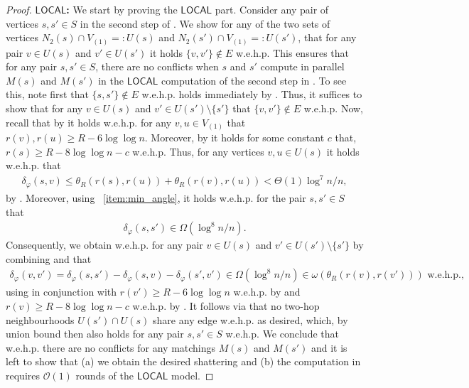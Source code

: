 \documentclass[letterpaper,11pt]{article}
\newcommand{\wehp}{w.e.h.p.\xspace}
\newcommand{\1}{\mathbb I}
\newcommand{\bigO}{\mathcal{O}}
\newcommand{\LOCAL}{\ensuremath{\mathsf{LOCAL}}\xspace}
\newcommand{\angulardist}[2]{\delta_\varphi(#1,#2)}
\begin{document}
\begin{proof}
\textbf{\LOCAL:}  We start by proving the \LOCAL part. Consider any pair of vertices $s, s' \in S$ in the second step of \algos. We show for any of the two sets of vertices $N_2(s) \cap V_{(1)} =: U(s) $ and  $N_2(s') \cap V_{(1)} =: U(s')$, that for any pair $v \in U(s)$ and $v' \in U(s')$ it holds $\{v,v'\} \not \in E$ \wehp This ensures that for any pair $s, s' \in S$,  there are no conflicts when $s$ and $s'$ compute in parallel $M(s)$ and $M(s')$ in the \LOCAL computation of the second step in \algos. To see this, note first that $\{s,s'\} \not\in E$ \wehp holds immediately by . Thus, it suffices to show that for any $v \in U(s)$ and $v' \in U(s')\setminus\{s'\}$ that $\{v,v'\} \not \in E$ \wehp Now, recall that by  it holds \wehp for any $v,u \in V_{(1)}$ that $r(v),r(u) \geq R - 6\log\log n$. Moreover, by  it holds for some constant $c$ that, $r(s) \geq R - 8\log\log n -c$ \wehp Thus, for any vertices $v, u \in U(s)$ it holds \wehp that 
  \begin{align}\label{eq:two-hop-angle}
      \angulardist{s}{v} \leq \theta_R(r(s), r(u)) + \theta_R(r(v), r(u)) < \Theta(1) \log^{7} n / n, 
  \end{align} 
by . Moreover, using ~\cref{item:min_angle}, it holds \wehp for the pair $s, s' \in S$ that
%
\begin{align}\label{eq:separator-angle}
     \angulardist{s}{s'}  \in  \Omega(\log^8 n / n).
\end{align}
%
Consequently, we obtain \wehp for any pair $v \in U(s)$ and $v' \in U(s')\setminus\{s'\}$ by combining  and  that
%
\begin{align}\label{eq:two-hop-intersection}
    \angulardist{v}{v'} = \angulardist{s}{s'} - \angulardist{s}{v} - \angulardist{s'}{v'} \in \Omega(\log^8 n / n) \in \omega(\theta_R(r(v), r(v'))) \text{ \wehp,}
\end{align}
%
using  in conjunction with $r(v') \geq R - 6\log\log n$ \wehp by  and $r(v) \geq R - 8\log\log n -c$ \wehp by . It follows via  that no two-hop neighbourhoods $U(s') \cap U(s)$ share any edge \wehp as desired, which, by union bound then also holds for any pair $s, s' \in S$ \wehp We conclude that \wehp there are no conflicts for any matchings $M(s)$ and $M(s')$ and it is left to show that (a) we obtain the desired shattering and (b) the computation in \algos requires $\bigO(1)$ rounds of the \LOCAL model.


\end{proof}
\end{document}
